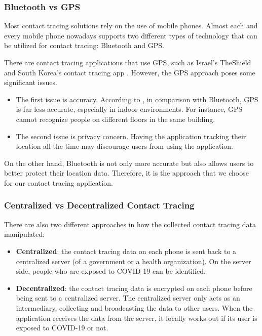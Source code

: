     \subsubsection{Bluetooth vs GPS}
      \par Most contact tracing solutions rely on the use of mobile phones. Almost each and every mobile phone nowadays supports two different types of technology that can be utilized for contact tracing: Bluetooth and GPS.
      \par There are contact tracing applications that use GPS, such as Israel's TheShield \cite{TheShield1} and South Korea's contact tracing app \cite{Korea1}. However, the GPS approach poses some significant issues.
      \begin{itemize}
        \item The first issue is accuracy. According to \cite{BlueTrace1}, in comparison with Bluetooth, GPS is far less accurate, especially in indoor environments. For instance, GPS cannot recognize people on different floors in the same building.
        \item The second issue is privacy concern. Having the application tracking their location all the time may discourage users from using the application.
      \end{itemize}
      \par On the other hand, Bluetooth is not only more accurate but also allows users to better protect their location data. Therefore, it is the approach that we choose for our contact tracing application.
  
    \subsubsection{Centralized vs Decentralized Contact Tracing}
      \par There are also two different approaches in how the collected contact tracing data manipulated:
        \begin{itemize}
          \item \textbf{Centralized}: the contact tracing data on each phone is sent back to a centralized server (of a government or a health organization). On the server side, people who are exposed to COVID-19 can be identified.
          \item \textbf{Decentralized}: the contact tracing data is encrypted on each phone before being sent to a centralized server. The centralized server only acts as an intermediary, collecting and broadcasting the data to other users. When the application receives the data from the server, it locally works out if its user is exposed to COVID-19 or not.
        \end{itemize}
    
